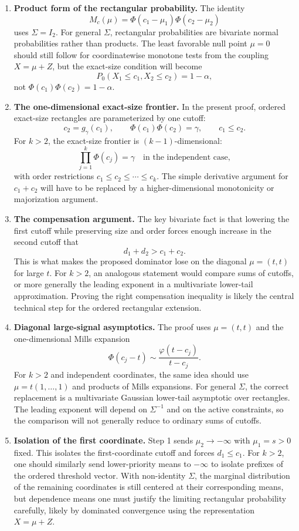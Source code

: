 \documentclass[12pt]{article}
\theoremstyle{definition}
\theoremstyle{remark}
\begin{document}
\begin{enumerate}[label=\textbf{(E\arabic*)},leftmargin=2.4em]
\item \textbf{Product form of the rectangular probability.}
The identity
\[
M_c(\mu)=\Phi(c_1-\mu_1)\Phi(c_2-\mu_2)
\]
uses $\Sigma=I_2$. For general $\Sigma$, rectangular probabilities are bivariate normal probabilities rather than products. The least favorable null point $\mu=0$ should still follow for coordinatewise monotone tests from the coupling $X=\mu+Z$, but the exact-size condition will become
\[
P_0(X_1\le c_1,X_2\le c_2)=1-\alpha,
\]
not $\Phi(c_1)\Phi(c_2)=1-\alpha$.

\item \textbf{The one-dimensional exact-size frontier.}
In the present proof, ordered exact-size rectangles are parameterized by one cutoff:
\[
c_2=g_\gamma(c_1),
\qquad
\Phi(c_1)\Phi(c_2)=\gamma,
\qquad
c_1\le c_2.
\]
For $k>2$, the exact-size frontier is $(k-1)$-dimensional:
\[
\prod_{j=1}^k \Phi(c_j)=\gamma
\quad\text{in the independent case},
\]
with order restrictions $c_1\le c_2\le\cdots\le c_k$. The simple derivative argument for $c_1+c_2$ will have to be replaced by a higher-dimensional monotonicity or majorization argument.

\item \textbf{The compensation argument.}
The key bivariate fact is that lowering the first cutoff while preserving size and order forces enough increase in the second cutoff that
\[
d_1+d_2>c_1+c_2.
\]
This is what makes the proposed dominator lose on the diagonal $\mu=(t,t)$ for large $t$. For $k>2$, an analogous statement would compare sums of cutoffs, or more generally the leading exponent in a multivariate lower-tail approximation. Proving the right compensation inequality is likely the central technical step for the ordered rectangular extension.

\item \textbf{Diagonal large-signal asymptotics.}
The proof uses $\mu=(t,t)$ and the one-dimensional Mills expansion
\[
\Phi(c_j-t)\sim \frac{\varphi(t-c_j)}{t-c_j}.
\]
For $k>2$ and independent coordinates, the same idea should use $\mu=t(1,\ldots,1)$ and products of Mills expansions. For general $\Sigma$, the correct replacement is a multivariate Gaussian lower-tail asymptotic over rectangles. The leading exponent will depend on $\Sigma^{-1}$ and on the active constraints, so the comparison will not generally reduce to ordinary sums of cutoffs.

\item \textbf{Isolation of the first coordinate.}
Step 1 sends $\mu_2\to-\infty$ with $\mu_1=s>0$ fixed. This isolates the first-coordinate cutoff and forces $d_1\le c_1$. For $k>2$, one should similarly send lower-priority means to $-\infty$ to isolate prefixes of the ordered threshold vector. With non-identity $\Sigma$, the marginal distribution of the remaining coordinates is still centered at their corresponding means, but dependence means one must justify the limiting rectangular probability carefully, likely by dominated convergence using the representation $X=\mu+Z$.


\end{enumerate}
\end{document}
